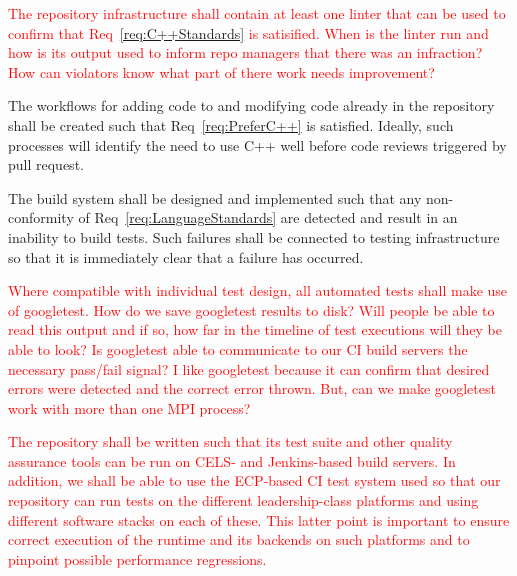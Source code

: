 \documentclass{article}
\begin{document}
\textcolor{red}{
\begin{spec}
The repository infrastructure shall contain at least one linter that can be used
to confirm that Req~\ref{req:C++Standards} is satisified.  When is the linter
run and how is its output used to inform repo managers that there was an
infraction?  How can violators know what part of there work needs improvement?
\end{spec}}

\begin{spec}
The workflows for adding code to and modifying code already in the repository
shall be created such that Req~\ref{req:PreferC++} is satisfied.  Ideally, such
processes will identify the need to use C++ well before code reviews triggered
by pull request.
\end{spec}

\begin{spec}
The build system shall be designed and implemented such that any non-conformity
of Req~\ref{req:LanguageStandards} are detected and result in an inability to
build tests.  Such failures shall be connected to testing infrastructure so that
it is immediately clear that a failure has occurred.
\end{spec}

\textcolor{red}{
\begin{spec}
Where compatible with individual test design, all automated tests shall make use
of googletest.  How do we save googletest results to disk?  Will people be able
to read this output and if so, how far in the timeline of test executions will
they be able to look?  Is googletest able to communicate to our CI build servers
the necessary pass/fail signal?  I like googletest because it can confirm that
desired errors were detected and the correct error thrown.  But, can we make
googletest work with more than one MPI process?
\end{spec}}

\textcolor{red}{
\begin{spec}
The repository shall be written such that its test suite and other quality
assurance tools can be run on CELS- and Jenkins-based build servers.  In
addition, we shall be able to use the ECP-based CI test system used so that our
repository can run tests on the different leadership-class platforms and using
different software stacks on each of these.  This latter point is important to
ensure correct execution of the runtime and its backends on such platforms and
to pinpoint possible performance regressions.
\end{spec}}
\end{document}
